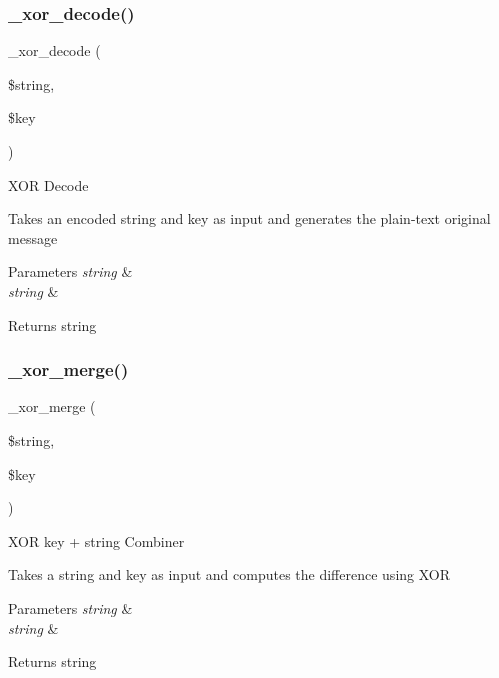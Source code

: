 \subsubsection{\texorpdfstring{\+\_\+xor\+\_\+decode()}{\_xor\_decode()}}
{\footnotesize\ttfamily \+\_\+xor\+\_\+decode (\begin{DoxyParamCaption}\item[{}]{\$string,  }\item[{}]{\$key }\end{DoxyParamCaption})\hspace{0.3cm}{\ttfamily [protected]}}

X\+OR Decode

Takes an encoded string and key as input and generates the plain-\/text original message


\begin{DoxyParams}{Parameters}
{\em string} & \\
\hline
{\em string} & \\
\hline
\end{DoxyParams}
\begin{DoxyReturn}{Returns}
string 
\end{DoxyReturn}
\mbox{\label{class_c_i___encrypt_aaf2644aeb5ec418eb4ddc2d70f372ada}} 
\subsubsection{\texorpdfstring{\+\_\+xor\+\_\+merge()}{\_xor\_merge()}}
{\footnotesize\ttfamily \+\_\+xor\+\_\+merge (\begin{DoxyParamCaption}\item[{}]{\$string,  }\item[{}]{\$key }\end{DoxyParamCaption})\hspace{0.3cm}{\ttfamily [protected]}}

X\+OR key + string Combiner

Takes a string and key as input and computes the difference using X\+OR


\begin{DoxyParams}{Parameters}
{\em string} & \\
\hline
{\em string} & \\
\hline
\end{DoxyParams}
\begin{DoxyReturn}{Returns}
string 
\end{DoxyReturn}
\mbox{\label{class_c_i___encrypt_a54562258204ebec3d699eed228c51199}} 
